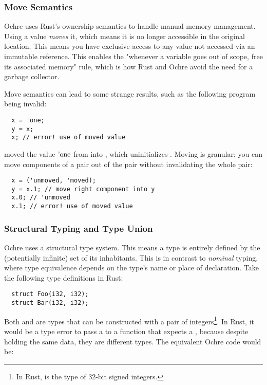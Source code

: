 \documentclass[12pt,twoside]{report}
\begin{document}
\subsubsection{Move Semantics}
Ochre uses Rust's ownership semantics to handle manual memory management. Using a value \textit{moves} it, which means it is no longer accessible in the original location. This means you have exclusive access to any value not accessed via an immutable reference. This enables the "whenever a variable goes out of scope, free its associated memory" rule, which is how Rust and Ochre avoid the need for a garbage collector.

Move semantics can lead to some strange results, such as the following program being invalid:

\begin{verbatim}
  x = 'one;
  y = x;
  x; // error! use of moved value
\end{verbatim}

 moved the value $\text{'one}$ from  into , which uninitializes . Moving is granular; you can move components of a pair out of the pair without invalidating the whole pair:

\begin{verbatim}
  x = ('unmoved, 'moved);
  y = x.1; // move right component into y
  x.0; // 'unmoved
  x.1; // error! use of moved value
\end{verbatim}

\subsubsection{Structural Typing and Type Union}
Ochre uses a structural type system. This means a type is entirely defined by the (potentially infinite) set of its inhabitants. This is in contrast to \textit{nominal} typing, where type equivalence depends on the type's name or place of declaration. Take the following type definitions in Rust:

\begin{verbatim}
  struct Foo(i32, i32);
  struct Bar(i32, i32);
\end{verbatim}

\noindent
Both  and  are types that can be constructed with a pair of integers\footnote{In Rust,  is the type of 32-bit signed integers.}. In Rust, it would be a type error to pass a  to a function that expects a , because despite holding the same data, they are different types. The equivalent Ochre code would be:
\end{document}
